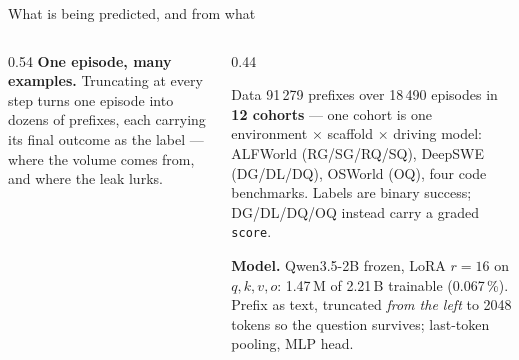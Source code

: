\documentclass[10pt, aspectratio=169]{beamer}
\begin{document}
\begin{frame}{What is being predicted, and from what}
\begin{columns}[t]
\begin{column}{0.54\textwidth}
\smallskip
\textbf{One episode, many examples.} Truncating at every step turns one episode
into dozens of prefixes, each carrying its final outcome as the label --- where
the volume comes from, and where the leak lurks.
\end{column}
\begin{column}{0.44\textwidth}
\begin{center}
\end{center}
\vspace{-4pt}
\vspace{-6pt}
\begin{block}{Data}
91\,279 prefixes over 18\,490 episodes in \textbf{12 cohorts} --- one cohort is
one environment $\times$ scaffold $\times$ driving model: ALFWorld
(RG/SG/RQ/SQ), DeepSWE (DG/DL/DQ), OSWorld (OQ), four code benchmarks. Labels
are binary success; DG/DL/DQ/OQ instead carry a graded \texttt{score}.
\end{block}
\vspace{-3pt}
\textbf{Model.} Qwen3.5-2B frozen, LoRA $r{=}16$ on $q,k,v,o$: 1.47\,M of
2.21\,B trainable (0.067\,\%). Prefix as text, truncated \emph{from the left}
to 2048 tokens so the question survives; last-token pooling, MLP head.
\end{column}
\end{columns}
\end{frame}
\end{document}
